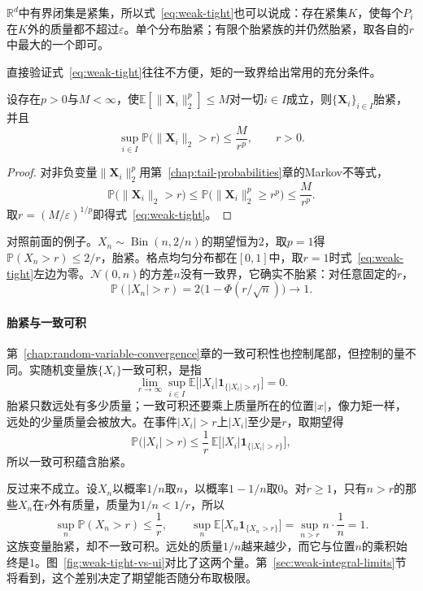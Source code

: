 $\mathbb{R}^{d}$中有界闭集是紧集，所以式~\eqref{eq:weak-tight}也可以说成：存在紧集$K$，使每个$P_i$在$K$外的质量都不超过$\varepsilon$。单个分布胎紧；有限个胎紧族的并仍然胎紧，取各自的$r$中最大的一个即可。

直接验证式~\eqref{eq:weak-tight}往往不方便，矩的一致界给出常用的充分条件。

\begin{theorem}[矩的一致界蕴含胎紧]
\label{thm:weak-moment-tight}
设存在$p>0$与$M<\infty$，使$\mathbb{E}[\lVert\bm{X}_i\rVert_2^{p}]\leq M$对一切$i\in I$成立，则$\{\bm{X}_i\}_{i\in I}$胎紧，并且
\begin{equation}
 \sup_{i\in I}\mathbb{P}\bigl(\lVert\bm{X}_i\rVert_2>r\bigr)\leq\frac{M}{r^{p}},\qquad r>0 .
 \label{eq:weak-moment-tight}
\end{equation}
\end{theorem}

\begin{proof}
对非负变量$\lVert\bm{X}_i\rVert_2^{p}$用第~\ref{chap:tail-probabilities}章的Markov不等式，
\[
 \mathbb{P}\bigl(\lVert\bm{X}_i\rVert_2>r\bigr)\leq\mathbb{P}\bigl(\lVert\bm{X}_i\rVert_2^{p}\geq r^{p}\bigr)\leq\frac{M}{r^{p}} .
\]
取$r=(M/\varepsilon)^{1/p}$即得式~\eqref{eq:weak-tight}。
\end{proof}

对照前面的例子。$X_n\sim\operatorname{Bin}(n,2/n)$的期望恒为$2$，取$p=1$得$\mathbb{P}(X_n>r)\leq2/r$，胎紧。格点均匀分布都在$[0,1]$中，取$r=1$时式~\eqref{eq:weak-tight}左边为零。$\mathcal{N}(0,n)$的方差$n$没有一致界，它确实不胎紧：对任意固定的$r$，
\[
 \mathbb{P}(\lvert X_n\rvert>r)=2\bigl(1-\Phi(r/\sqrt{n})\bigr)\longrightarrow1 .
\]

\paragraph{胎紧与一致可积}
第~\ref{chap:random-variable-convergence}章的一致可积性也控制尾部，但控制的量不同。实随机变量族$\{X_i\}$一致可积，是指
\[
 \lim_{r\to\infty}\sup_{i\in I}\mathbb{E}\bigl[\lvert X_i\rvert\mathbf{1}_{\{\lvert X_i\rvert>r\}}\bigr]=0 .
\]
胎紧只数远处有多少质量；一致可积还要乘上质量所在的位置$\lvert x\rvert$，像力矩一样，远处的少量质量会被放大。在事件$\lvert X_i\rvert>r$上$\lvert X_i\rvert$至少是$r$，取期望得
\[
 \mathbb{P}\bigl(\lvert X_i\rvert>r\bigr)\leq\frac1r\,\mathbb{E}\bigl[\lvert X_i\rvert\mathbf{1}_{\{\lvert X_i\rvert>r\}}\bigr] ,
\]
所以一致可积蕴含胎紧。

反过来不成立。设$X_n$以概率$1/n$取$n$，以概率$1-1/n$取$0$。对$r\geq1$，只有$n>r$的那些$X_n$在$r$外有质量，质量为$1/n<1/r$，所以
\[
 \sup_{n}\mathbb{P}(X_n>r)\leq\frac1r,\qquad \sup_{n}\mathbb{E}\bigl[X_n\mathbf{1}_{\{X_n>r\}}\bigr]=\sup_{n>r}n\cdot\frac1n=1 .
\]
这族变量胎紧，却不一致可积。远处的质量$1/n$越来越少，而它与位置$n$的乘积始终是$1$。图~\ref{fig:weak-tight-vs-ui}对比了这两个量。第~\ref{sec:weak-integral-limits}节将看到，这个差别决定了期望能否随分布取极限。

